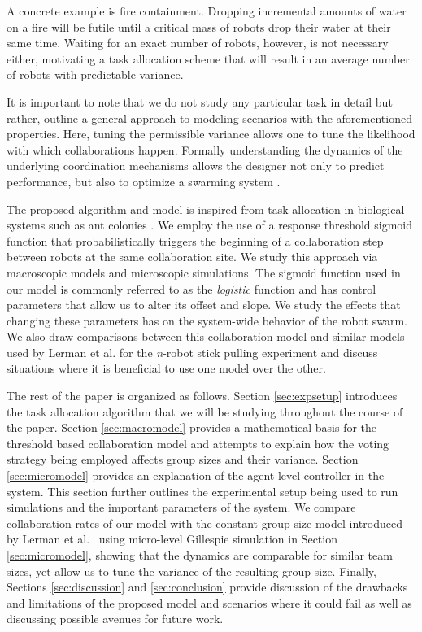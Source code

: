 \documentclass{TeXstyles/DARS/svmult}  %
\begin{document}
A concrete example is fire containment. Dropping incremental amounts of water on a fire will be futile until a critical mass of robots drop their water at their same time. Waiting for an exact number of robots, however, is not necessary either, motivating a task allocation scheme that will result in an average number of robots with predictable variance. 

It is important to note that we do not study any particular task in detail but rather, outline a general approach to modeling scenarios with the aforementioned properties. Here, tuning the permissible variance allows one to tune the likelihood with which collaborations happen. Formally understanding the dynamics of the underlying coordination mechanisms allows the designer not only to predict performance, but also to optimize a swarming system \cite{Correll2008}.  

The proposed algorithm and model is inspired from task allocation in biological systems such as ant colonies \cite{Bonabeau1999,Krieger2000}. We employ the use of a response threshold sigmoid function that probabilistically triggers the beginning of a collaboration step between robots at the same collaboration site. We study this approach via macroscopic models and microscopic simulations. The sigmoid function used in our model is commonly referred to as the \emph{logistic} function and has control parameters that allow us to alter its offset and slope. We study the effects that changing these parameters has on the system-wide behavior of the robot swarm. We also draw comparisons between this collaboration model and similar models used by Lerman et al. for the \emph{n}-robot stick pulling experiment \cite{Lerman2001} and discuss situations where it is beneficial to use one model over the other.

The rest of the paper is organized as follows. Section \ref{sec:expsetup} introduces the task allocation algorithm that we will be studying throughout the course of the paper.
Section \ref{sec:macromodel} provides a mathematical basis for the threshold based collaboration model and attempts to explain how the voting strategy being employed affects group sizes and their variance.
Section \ref{sec:micromodel} provides an explanation of the agent level controller in the system. This section further outlines the experimental setup being used to run simulations and the important parameters of the system. 
We compare collaboration rates of our model with the constant group size model introduced by Lerman et al.~\cite{Lerman2001} using micro-level Gillespie simulation in Section \ref{sec:micromodel}, showing that the dynamics are comparable for similar team sizes, yet allow us to tune the variance of the resulting group size.  
Finally, Sections \ref{sec:discussion} and \ref{sec:conclusion} provide discussion of the drawbacks and limitations of the proposed model and scenarios where it could fail as well as discussing possible avenues for future work.
\end{document}
